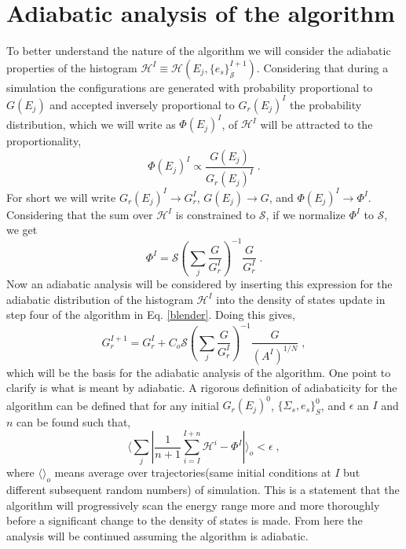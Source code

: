 \documentclass[aps,pre,reprint,superscriptaddress,showkeys]{revtex4-2}
\begin{document}
\section{Adiabatic analysis of the algorithm}
\label{sec3}
To better understand the nature of the algorithm we will consider the adiabatic properties of the histogram $\mathcal{H}^I\equiv \mathcal{H}(E_j, \{e_s\}_\mathcal{S}^{I+1})$. Considering that during a simulation the configurations are generated with probability proportional to $G(E_j)$ and accepted inversely proportional to $G_{r}(E_j)^I$ the probability distribution, which we will write as $\Phi(E_j)^I$, of  $\mathcal{H}^I$ will be attracted to the proportionality,
\begin{equation}
 \Phi(E_j)^I\propto \frac{G(E_j)}{G_r(E_j)^I} \;.
 \end{equation}
  For short we will write $G_r(E_j)^I \rightarrow G_r^I$, $G(E_j)\rightarrow G$, and $\Phi(E_j)^I\rightarrow \Phi^I$.  Considering that the sum over $\mathcal{H}^I$ is constrained to $\mathcal{S}$, if we normalize $\Phi^I$ to $\mathcal{S}$, we get
\begin{equation}
\Phi^I = \mathcal{S}(\sum_{j}\frac{G}{G_r^I})^{-1}\frac{G}{G_r^I} \;.
\label{adiabatic_distribution}
\end{equation}
Now an adiabatic analysis will be considered by inserting this expression for the adiabatic distribution of the histogram $\mathcal{H}^I$ into the density of states update  in step four of the algorithm in Eq. \ref{blender}.  Doing this gives, 
\begin{equation}
G_r^{I+1} = G_r^I  +   C_o\mathcal{S}(\sum_{j}\frac{G}{G_r^I})^{-1}\frac{G}{(A^I)^{1/N}}  \;,
\label{adiabatic_update}
\end{equation}
which will be the basis for the adiabatic analysis of the algorithm. One point to clarify is what is meant by adiabatic. A rigorous definition of adiabaticity for the algorithm can be defined that for any initial $G_r(E_j)^0$, $\{\Sigma_s,e_s\}_S^0$, and $\epsilon$ an  $I$ and $n$ can be found such that, 
\begin{equation}
  \langle \sum_j |\frac{1}{n+1}{\sum_{i=I}^{I+n}\mathcal{H}^i -  \Phi^I}| \rangle_o < \epsilon \;,
\end{equation}
where $\langle \rangle_o$ means average over trajectories(same initial conditions at $I$ but different subsequent random numbers) of simulation. This is a statement that the algorithm will progressively scan the energy range more and more thoroughly before a significant change to the density of states is made.   From here the analysis will be continued assuming the algorithm is adiabatic. 
\end{document}
